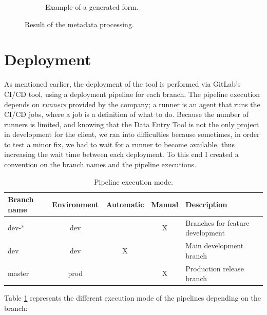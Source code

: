 \begin{figure}[!htb]
\begin{subfigure}{\linewidth}
        \caption{Example of a generated form.}
        \label{fig:exampleEdit}
    \end{subfigure}
    \caption{Result of the metadata processing.}
\end{figure}


\clearpage
\section{Deployment}
As mentioned earlier, the deployment of the tool is performed via GitLab's CI/CD tool, using a deployment pipeline for each branch. The pipeline execution depends on \emph{runners} provided by the company; a runner is an agent that runs the CI/CD jobs, where a job is a definition of what to do. Because the number of runners is limited, and knowing that the Data Entry Tool is not the only project in development for the client, we ran into difficulties because sometimes, in order to test a minor fix, we had to wait for a runner to become available, thus increasing the wait time between each deployment.  To this end I created a convention on the branch names and the pipeline executions.

\begin{table}[!htb]   
\small
  \centering
  \caption{Pipeline execution mode.}
  \begin{tabular}{|l|c|c|c|l|}
    \hline
    \textbf{Branch name} & \textbf{Environment} & \textbf{Automatic} & \textbf{Manual} & \textbf{Description}             \\\hline
    dev-*                & dev                  &                    & X               & Branches for feature development \\\hline
    dev                  & dev                  & X                  &                 & Main development branch          \\\hline
    master               & prod                 &                    & X               & Production release branch        \\\hline
  \end{tabular}
  
  \label{tab:pipe}
\end{table}

Table \ref{tab:pipe} represents the different execution mode of the pipelines depending on the branch: 

